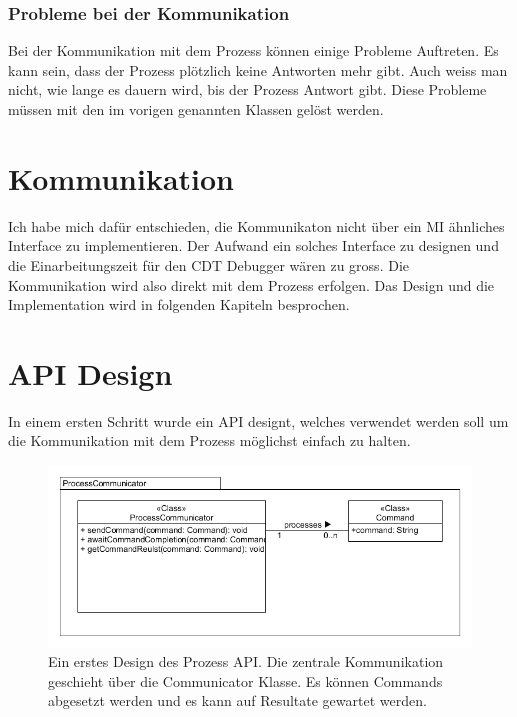 \subsubsection{Probleme bei der Kommunikation}

Bei der Kommunikation mit dem Prozess können einige Probleme Auftreten. Es kann sein, dass der Prozess plötzlich keine Antworten mehr gibt. Auch weiss man nicht, wie lange es dauern wird, bis der Prozess Antwort gibt. Diese Probleme müssen mit den im vorigen genannten Klassen gelöst werden.

\section{Kommunikation}

Ich habe mich dafür entschieden, die Kommunikaton nicht über ein MI ähnliches Interface zu implementieren. Der Aufwand ein solches Interface zu designen und die Einarbeitungszeit für den CDT Debugger wären zu gross. Die Kommunikation wird also direkt mit dem Prozess erfolgen. Das Design und die Implementation wird in folgenden Kapiteln besprochen.


\section{API Design}

In einem ersten Schritt wurde ein API designt, welches verwendet werden soll um die Kommunikation mit dem Prozess möglichst einfach zu halten.

\begin{figure}[H]
	\centering
		\includegraphics[scale=0.6]{forthcommunication/api.png}
		\caption{Ein erstes Design des Prozess API. Die zentrale Kommunikation geschieht über die Communicator Klasse. Es können Commands abgesetzt werden und es kann auf Resultate gewartet werden.}
		\label{fig:api}
\end{figure}

